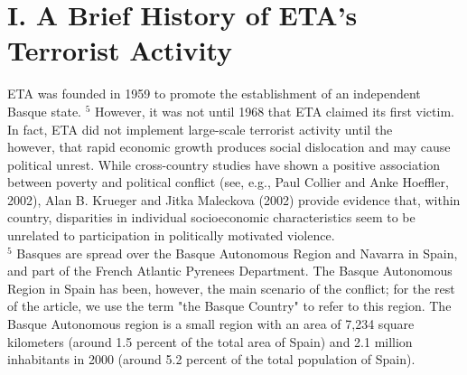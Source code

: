 \documentclass[10pt]{article}
\begin{document}
\section*{I. A Brief History of ETA's Terrorist Activity}
ETA was founded in 1959 to promote the establishment of an independent Basque state. ${ }^{5}$ However, it was not until 1968 that ETA claimed its first victim. In fact, ETA did not implement large-scale terrorist activity until the\\
however, that rapid economic growth produces social dislocation and may cause political unrest. While cross-country studies have shown a positive association between poverty and political conflict (see, e.g., Paul Collier and Anke Hoeffler, 2002), Alan B. Krueger and Jitka Maleckova (2002) provide evidence that, within country, disparities in individual socioeconomic characteristics seem to be unrelated to participation in politically motivated violence.\\
${ }^{5}$ Basques are spread over the Basque Autonomous Region and Navarra in Spain, and part of the French Atlantic Pyrenees Department. The Basque Autonomous Region in Spain has been, however, the main scenario of the conflict; for the rest of the article, we use the term "the Basque Country" to refer to this region. The Basque Autonomous region is a small region with an area of 7,234 square kilometers (around 1.5 percent of the total area of Spain) and 2.1 million inhabitants in 2000 (around 5.2 percent of the total population of Spain).
\end{document}

